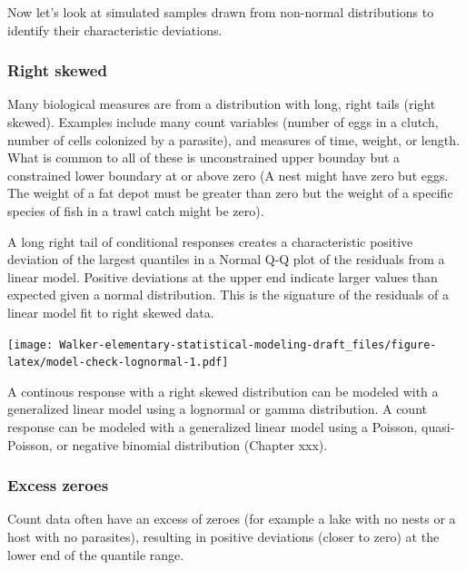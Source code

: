\documentclass[]{book}
\begin{document}
Now let's look at simulated samples drawn from non-normal distributions
to identify their characteristic deviations.

\subsubsection{Right skewed}\label{right-skewed}

Many biological measures are from a distribution with long, right tails
(right skewed). Examples include many count variables (number of eggs in
a clutch, number of cells colonized by a parasite), and measures of
time, weight, or length. What is common to all of these is unconstrained
upper bounday but a constrained lower boundary at or above zero (A nest
might have zero but eggs. The weight of a fat depot must be greater than
zero but the weight of a specific species of fish in a trawl catch might
be zero).

A long right tail of conditional responses creates a characteristic
positive deviation of the largest quantiles in a Normal Q-Q plot of the
residuals from a linear model. Positive deviations at the upper end
indicate larger values than expected given a normal distribution. This
is the signature of the residuals of a linear model fit to right skewed
data.

\texttt{[image: Walker-elementary-statistical-modeling-draft\_files/figure-latex/model-check-lognormal-1.pdf]}

A continous response with a right skewed distribution can be modeled
with a generalized linear model using a lognormal or gamma distribution.
A count response can be modeled with a generalized linear model using a
Poisson, quasi-Poisson, or negative binomial distribution (Chapter xxx).

\subsubsection{Excess zeroes}\label{excess-zeroes}

Count data often have an excess of zeroes (for example a lake with no
nests or a host with no parasites), resulting in positive deviations
(closer to zero) at the lower end of the quantile range.
\end{document}
